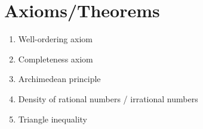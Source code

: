 \documentclass[12pt]{amsart}
\begin{document}
\section*{Axioms/Theorems}

\begin{enumerate}
	\item Well-ordering axiom
	\item Completeness axiom
	\item Archimedean principle
	\item Density of rational numbers / irrational numbers


	\item Triangle inequality
		\begin{comment}
	\item Theorem 10.2 (limits and algebra)

	\item Squeeze Theorem
	\item Monotone convergence theorem

	\item Principle of induction
					
	\item Theorem on convergence and subsequences
	\item Cantor's Theorem

	\item Bolzano-Weierstrass

	\item Main corollary of Bolzano-Weierstrass
	

	\item Theorem on limits and sequences
	\item Theorem on limits of functions and algebra
	\item Squeeze Theorem for functions


	\item Theorem on continuity and limits
	
	\item Theorem on continuity and algebra
	\item Theorem on continuity and compositions
			\item Intermediate Value Theorem
	\item Boundedness Theorem
	\item Extreme Value Theorem
	

	\item Derivatives and algebra 
		\item Derivatives and minima/maxima
	\item Mean Value Theorem
	\item Increasing/decreasing functions and derivatives
\end{comment}
\end{enumerate}
\end{document}
